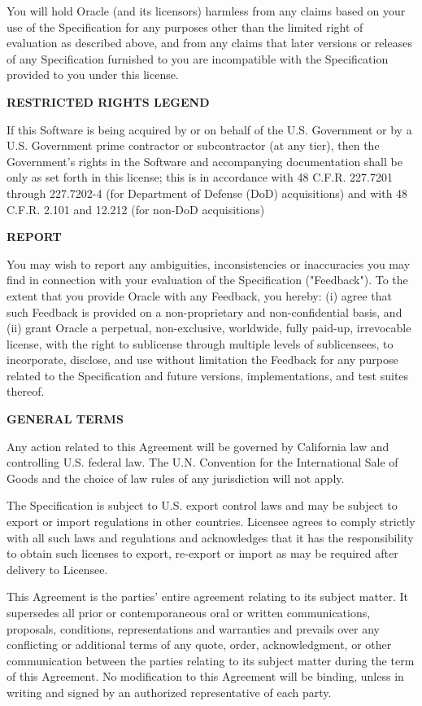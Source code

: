 \begin{flushleft}
You will hold Oracle (and its licensors) harmless from any claims based on your use of the Specification for any purposes other than the limited right of evaluation as described above, and from any claims that later versions or releases of any Specification furnished to you are incompatible with the Specification provided to you under this license.

{\bfseries RESTRICTED RIGHTS LEGEND}

If this Software is being acquired by or on behalf of the U.S. Government or by a U.S. Government prime contractor or subcontractor (at any tier), then the Government's rights in the Software and accompanying documentation shall be only as set forth in this license; this is in accordance with 48 C.F.R. 227.7201 through 227.7202-4 (for Department of Defense (DoD) acquisitions) and with 48 C.F.R. 2.101 and 12.212 (for non-DoD acquisitions)

{\bfseries REPORT}

You may wish to report any ambiguities, inconsistencies or inaccuracies you may find in connection with your evaluation of the Specification ("Feedback"). To the extent that you provide Oracle with any Feedback, you hereby: (i) agree that such Feedback is provided on a non-proprietary and non-confidential basis, and (ii) grant Oracle a perpetual, non-exclusive, worldwide, fully paid-up, irrevocable license, with the right to sublicense through multiple levels of sublicensees, to incorporate, disclose, and use without limitation the Feedback for any purpose related to the Specification and future versions, implementations, and test suites thereof.

{\bfseries GENERAL TERMS}

Any action related to this Agreement will be governed by California law and controlling U.S. federal law. The U.N. Convention for the International Sale of Goods and the choice of law rules of any jurisdiction will not apply.

The Specification is subject to U.S. export control laws and may be subject to export or import regulations in other countries. Licensee agrees to comply strictly with all such laws and regulations and acknowledges that it has the responsibility to obtain such licenses to export, re-export or import as may be required after delivery to Licensee.

This Agreement is the parties' entire agreement relating to its subject matter. It supersedes all prior or contemporaneous oral or written communications, proposals, conditions, representations and warranties and prevails over any conflicting or additional terms of any quote, order, acknowledgment, or other communication between the parties relating to its subject matter during the term of this Agreement. No modification to this Agreement will be binding, unless in writing and signed by an authorized representative of each party.

\end{flushleft}
